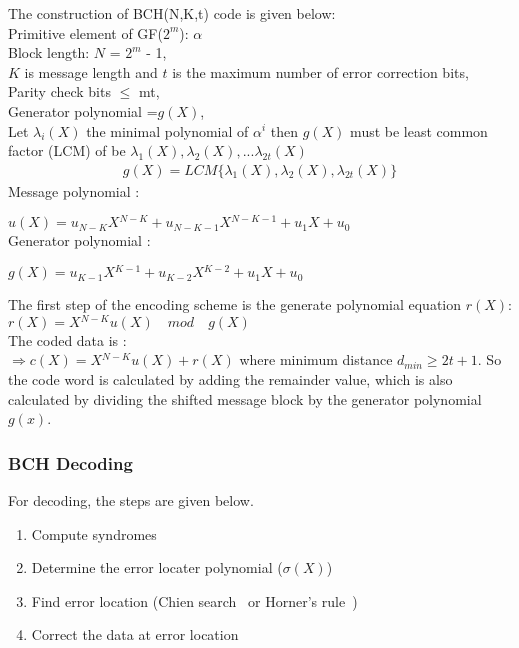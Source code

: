 \documentclass[10pt, conference, compsocconf]{IEEEtran}
\begin{document}
The construction of BCH(N,K,t) code is given below:\\
Primitive element of GF($2^{m}$):     $\alpha$ \\
Block length: $N$ = $2^{m}$ - 1,\\
$K$ is message length and $t$ is the maximum number of error correction bits,\\
Parity check bits $\leq$ mt,\\
Generator polynomial =$g(X)$, \\
Let $ \lambda{_i}\left(X\right)$ 
 the minimal polynomial of $\alpha{^i}$  then $g(X)$ must be least common factor (LCM) of  be $\lambda{_1}\left(X\right), \lambda{_2}\left(X\right) , ...  \lambda{_{2t}}\left(X\right)$\\
\begin{eqnarray}
 g(X)=LCM\lbrace\lambda{_1}\left(X \right) ,\lambda{_2}\left( X\right) ,\lambda{_{2t}} \left(X\right)\rbrace  
 \end{eqnarray}
Message polynomial :

$u\left(X\right)=u{_{N-K}}X{^{N-K}} +u{_{N-K-1}}X{^{N-K-1}} + u{_1}X+u{_0}$ \\
Generator polynomial : 

$g\left(X\right)=u{_{K-1}}X{^{K-1}} +u{_{K-2}}X{^{K-2}} + u{_1}X+u{_0}$

The first step of the encoding scheme is the generate polynomial equation $r(X)$: \\
$r\left(X\right) = X{^{N-K}}u\left(X\right)\quad mod\quad g\left(X\right)$ 
\\ The coded data is : \\ $ \Rightarrow c\left(X\right)=X{^{N-K}}u\left(X\right)+r\left(X\right)$ where minimum distance $d{_{min}}\geq 2t+1$.
So the code word is calculated by adding the remainder value, which is also calculated by dividing the shifted message block by the generator polynomial $g(x)$. 
\subsubsection{BCH Decoding}
For decoding, the steps are given below.

\begin{enumerate}
    \item Compute syndromes
    \item Determine the error locater polynomial ($\sigma\left(X\right)$)
      \item Find error location (Chien search~\cite{chien:search} or Horner's rule~\cite{horner:search})
            \item Correct the data at error location
      \end{enumerate}
      
\end{document}
